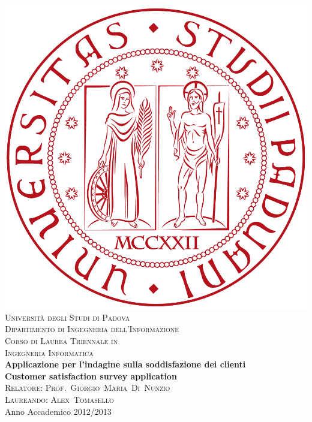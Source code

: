 



\begin{titlepage}
\begin{center}
\includegraphics[scale=0.08]{icons/logo.png}\\[1.5cm]
\textsc{\LARGE Università degli Studi di Padova}\\[1.2cm]
\textsc{\Large Dipartimento di Ingegneria dell'Informazione}\\[0.8cm]
\textsc{\Large Corso di Laurea Triennale in}\\[0.5cm]
\textsc{\Large Ingegneria Informatica}\\[2cm]
{ \LARGE \bfseries Applicazione per l'indagine sulla soddisfazione dei
clienti}\\[1cm]
{  \bfseries Customer satisfaction survey application}\\[2cm] 
\textsc{\large Relatore: Prof.~Giorgio~Maria~Di~Nunzio}\\[0.5cm]
\textsc{\large Laureando: Alex~Tomasello}\\
\vfill
{\large Anno Accademico 2012/2013}
\end{center}
\end{titlepage}


